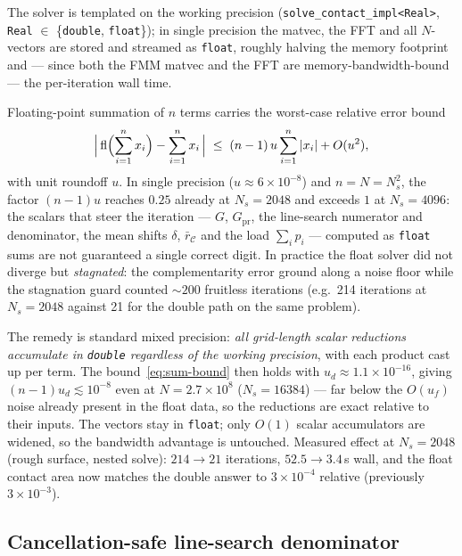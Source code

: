 \documentclass[11pt,a4paper]{article}
\newcommand{\calC}{\mathcal{C}}
\begin{document}
The solver is templated on the working precision
(\texttt{solve\_contact\_impl<Real>}, \texttt{Real} $\in$
\{\texttt{double}, \texttt{float}\}); in single precision the matvec, the FFT
and all $N$-vectors are stored and streamed as \texttt{float}, roughly halving
the memory footprint and --- since both the FMM matvec and the FFT are
memory-bandwidth-bound --- the per-iteration wall time.

Floating-point summation of $n$ terms carries the worst-case relative error
bound~\cite{Higham2002}
\begin{equation}
  \Bigl|\,\mathrm{fl}\Bigl(\sum_{i=1}^{n} x_i\Bigr) - \sum_{i=1}^{n} x_i\,\Bigr|
  \;\leq\; (n-1)\,u \sum_{i=1}^{n} |x_i| + O(u^2),
  \label{eq:sum-bound}
\end{equation}
with unit roundoff $u$.  In single precision ($u \approx 6\times10^{-8}$) and
$n = N = N_s^2$, the factor $(n-1)u$ reaches $0.25$ already at $N_s = 2048$
and exceeds $1$ at $N_s = 4096$: the scalars that steer the iteration ---
$G$, $G_{\mathrm{pr}}$, the line-search numerator and denominator, the mean
shifts $\delta$, $\bar r_\calC$ and the load $\sum_i p_i$ --- computed as
\texttt{float} sums are not guaranteed a single correct digit.  In practice
the float solver did not diverge but \emph{stagnated}: the complementarity
error ground along a noise floor while the stagnation guard counted
$\sim 200$ fruitless iterations (e.g.\ 214 iterations at $N_s = 2048$ against
21 for the double path on the same problem).

The remedy is standard mixed precision: \emph{all grid-length scalar
reductions accumulate in \texttt{double} regardless of the working precision},
with each product cast up per term.  The bound~\eqref{eq:sum-bound} then holds
with $u_d \approx 1.1\times10^{-16}$, giving $(n-1)u_d \lesssim 10^{-8}$ even
at $N = 2.7\times10^{8}$ ($N_s = 16384$) --- far below the $O(u_f)$ noise
already present in the float data, so the reductions are exact relative to
their inputs.  The vectors stay in \texttt{float}; only $O(1)$ scalar
accumulators are widened, so the bandwidth advantage is untouched.  Measured
effect at $N_s = 2048$ (rough surface, nested solve): $214 \to 21$ iterations,
$52.5 \to 3.4$\,s wall, and the float contact area now matches the double
answer to $3\times10^{-4}$ relative (previously $3\times10^{-3}$).

\subsection{Cancellation-safe line-search denominator}
\label{sec:impl-cancel}
\end{document}
